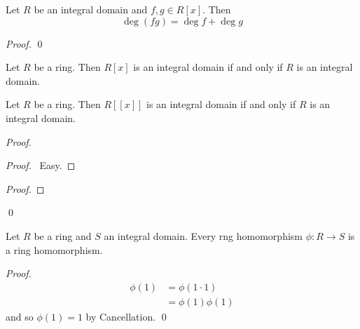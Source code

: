 \begin{prop}
Let $R$ be an integral domain and $f,g \in R[x]$. Then
\[ \deg(fg) = \deg f + \deg g \]
\end{prop}

\begin{proof}
\pf
{}
\qed
\end{proof}

\begin{cor}
Let $R$ be a ring. Then $R[x]$ is an integral domain if and only if $R$ is an integral domain.
\end{cor}

\begin{prop}
Let $R$ be a ring. Then $R[[x]]$ is an integral domain if and only if $R$ is an integral domain.
\end{prop}

\begin{proof}
\pf
{}
\begin{proof}
	\pf\ Easy.
\end{proof}
\begin{proof}
\end{proof}
\qed
\end{proof}

\begin{prop}
Let $R$ be a ring and $S$ an integral domain. Every rng homomorphism $\phi : R \rightarrow S$ is a ring homomorphism.
\end{prop}

\begin{proof}
\pf
\begin{align*}
\phi(1) & = \phi(1 \cdot 1) \\
& = \phi(1) \phi(1)
\end{align*}
and so $\phi(1) = 1$ by Cancellation. \qed
\end{proof}

